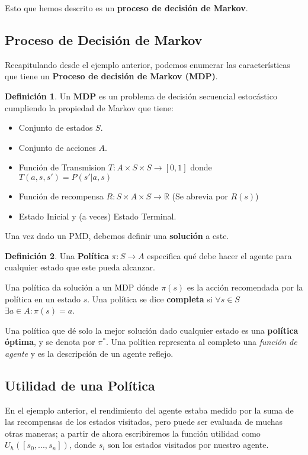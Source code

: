 \documentclass[12pt,a4paper,catalan, leqno]{article} %
\newcommand{\R}{\mathbb{R}}
\theoremstyle{definition}
\newtheorem{defn}{Definición}[section]
\begin{document}
Esto que hemos descrito es un \textbf{proceso de decisión de Markov}.

\subsection{Proceso de Decisión de Markov}

Recapitulando desde el ejemplo anterior, podemos enumerar las características que tiene un \textbf{Proceso de decisión de Markov (MDP)}.

\begin{defn}
Un \textbf{MDP} es un problema de decisión secuencial estocástico cumpliendo la propiedad de Markov que tiene:
\begin{itemize}
    \item Conjunto de estados $S$.
    \item Conjunto de acciones $A$.
    \item Función de Transmision $T: A\times S\times S \rightarrow [0,1]$ donde $T(a,s,s') = P(s'|a,s)$
    \item Función de recompensa $R: S\times A\times S  \rightarrow \R$ (Se abrevia por $R(s)$)
    \item Estado Inicial y (a veces) Estado Terminal.
\end{itemize}
\end{defn}

Una vez dado un PMD, debemos definir una \textbf{solución} a este.

\begin{defn}
Una \textbf{Política} $\pi: S \rightarrow A$ especifica qué debe hacer el agente para cualquier estado que este pueda alcanzar.
\end{defn}

Una política da solución a un MDP dónde $\pi(s)$ es la acción recomendada por la política en un estado $s$. Una política se dice \textbf{completa} si $\forall s \in S $ $\exists a \in A : \pi(s) = a$.

Una política que dé solo la mejor solución dado cualquier estado es una \textbf{política óptima}, y se denota por $\pi^*$. Una política representa al completo una \textit{función de agente} y es la descripción de un agente reflejo.

\subsection{Utilidad de una Política}

En el ejemplo anterior, el rendimiento del agente estaba medido por la suma de las recompensas de los estados visitados, pero puede ser evaluada de muchas otras maneras; a partir de ahora escribiremos la función utilidad como $U_h([s_0,...,s_n])$, donde $s_i$ son los estados visitados por nuestro agente.
\end{document}
